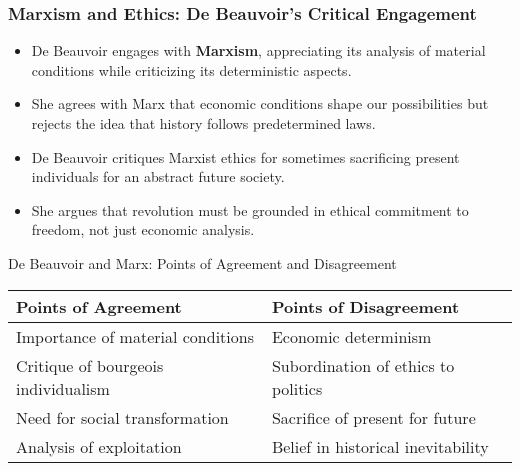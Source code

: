 \documentclass[aspectratio=169]{beamer}
\begin{document}
	\begin{frame}
		\frametitle{Marxism and Ethics: De Beauvoir's Critical Engagement}
		\begin{itemize}
			\item De Beauvoir engages with \textbf{Marxism}, appreciating its analysis of material conditions while criticizing its deterministic aspects.
			\item She agrees with Marx that economic conditions shape our possibilities but rejects the idea that history follows predetermined laws.
			\item De Beauvoir critiques Marxist ethics for sometimes sacrificing present individuals for an abstract future society.
			\item She argues that revolution must be grounded in ethical commitment to freedom, not just economic analysis.
		\end{itemize}
		
		\begin{block}{De Beauvoir and Marx: Points of Agreement and Disagreement}
			\begin{tabular}{p{} | p{}}
				\textbf{Points of Agreement} & \textbf{Points of Disagreement} \\
				\hline
				Importance of material conditions & Economic determinism \\
				Critique of bourgeois individualism & Subordination of ethics to politics \\
				Need for social transformation & Sacrifice of present for future \\
				Analysis of exploitation & Belief in historical inevitability \\
			\end{tabular}
		\end{block}
	\end{frame}
	
\end{document}
